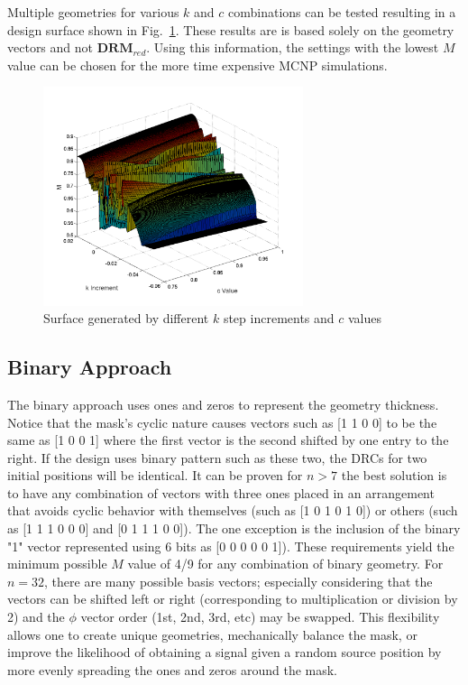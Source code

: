 \documentclass[3p,times]{elsarticle}
\begin{document}
Multiple geometries for various $k$ and $c$ combinations can be tested resulting in a design surface shown in Fig.~\ref{fig:surf}.  These results are is based solely on the geometry vectors
and not $\mathbf{DRM}_{red}$.  
Using this information, the settings with the lowest $M$ value can be chosen for the more time expensive MCNP simulations.
\begin{figure}[ht!]
\includegraphics[width={3.0in}]{../figs/Eigprob32bitCouple2W1.pdf}
\centering
\caption{Surface generated by different $k$ step increments and $c$ values}
\label{fig:surf}
\end{figure}

\subsection{Binary Approach}
The binary approach uses ones and zeros to represent the geometry thickness.  Notice that the mask's cyclic nature causes vectors such as [1 1 0 0] to be the same as [1 0 0 1] where the first vector
is the second shifted by one entry to the right.  If the design uses binary pattern such as these two, the DRCs for two initial positions will be identical.  It can be proven for $n>7$ the best
solution is to have any combination of vectors with three ones placed in an arrangement that avoids cyclic behavior with themselves (such as [1 0 1 0 1 0]) or others (such as [1 1 1 0 0 0] and 
[0 1 1 1 0 0]).  The one exception is the inclusion of the binary "1" vector represented using 6 bits as [0 0 0 0 0 1]).  These requirements yield the minimum possible $M$ value of 4/9 for
any combination of binary geometry.  For $n=32$, there are many possible basis vectors; especially considering that the vectors can be shifted left or right 
(corresponding to multiplication or division by 2) and the $\phi$ vector order (1st, 2nd, 3rd, etc) may be swapped.  This flexibility allows one
to create unique geometries, mechanically balance the mask, or improve the likelihood of obtaining a signal given a random source position by more evenly spreading the ones and zeros around the mask.
\end{document}

